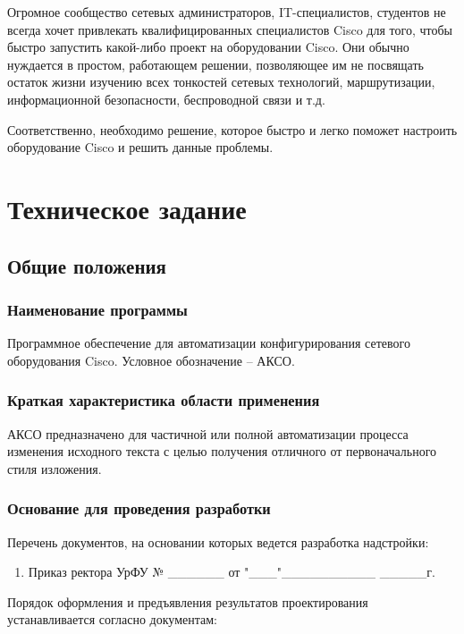 \documentclass[a4paper,14pt]{extreport}
\begin{document}
	Огромное сообщество сетевых администраторов, IT-специалистов, студентов не всегда хочет привлекать квалифицированных специалистов
	Cisco для того, чтобы быстро запустить какой-либо проект на оборудовании Cisco. Они обычно нуждается в простом, работающем решении,
	позволяющее им не посвящать остаток жизни изучению всех тонкостей сетевых технологий, маршрутизации, информационной безопасности, беспроводной связи и т.д.
	
	Соответственно, необходимо решение, которое быстро и легко поможет настроить оборудование Cisco и решить данные проблемы.
	
	\chapter{Техническое задание}
	
	\section{Общие положения}
	
	\subsection{Наименование программы}
	
	Программное обеспечение для автоматизации конфигурирования сетевого оборудования Cisco. Условное обозначение – АКСО\cite{gost-19.201-78}.
	
	\subsection{Краткая характеристика области применения}
	
	АКСО предназначено для частичной или полной автоматизации процесса изменения исходного текста с целью получения отличного от первоначального стиля изложения.
	
	\subsection{Основание для проведения разработки}
	Перечень документов, на основании которых ведется разработка надстройки:
	
	\begin{enumerate}
		\item Приказ ректора УрФУ № \_\_\_\_\_\_ от "\_\_\_"\_\_\_\_\_\_\_\_\_\_ \_\_\_\_\_г.
	\end{enumerate}
		
	Порядок оформления и предъявления результатов проектирования устанавливается согласно документам:
	
\end{document}
